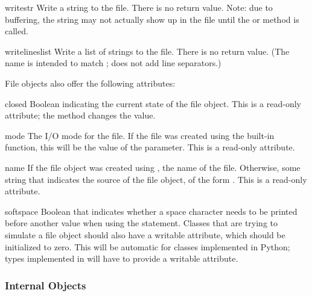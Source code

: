 \begin{methoddesc}[file]{write}{str}
Write a string to the file.  There is no return value.  Note: due to
buffering, the string may not actually show up in the file until
the  or  method is called.
\end{methoddesc}

\begin{methoddesc}[file]{writelines}{list}
Write a list of strings to the file.  There is no return value.
(The name is intended to match ;
 does not add line separators.)
\end{methoddesc}


File objects also offer the following attributes:

\begin{memberdesc}[file]{closed}
Boolean indicating the current state of the file object.  This is a
read-only attribute; the  method changes the value.
\end{memberdesc}

\begin{memberdesc}[file]{mode}
The I/O mode for the file.  If the file was created using the
 built-in function, this will be the value of the
 parameter.  This is a read-only attribute.
\end{memberdesc}

\begin{memberdesc}[file]{name}
If the file object was created using , the name of
the file.  Otherwise, some string that indicates the source of the
file object, of the form \samp{<\mbox{\ldots}>}.  This is a read-only
attribute.
\end{memberdesc}

\begin{memberdesc}[file]{softspace}
Boolean that indicates whether a space character needs to be printed
before another value when using the  statement.
Classes that are trying to simulate a file object should also have a
writable  attribute, which should be initialized to
zero.  This will be automatic for classes implemented in Python; types
implemented in \C{} will have to provide a writable 
attribute.
\end{memberdesc}

\subsubsection{Internal Objects \label{typesinternal}}

